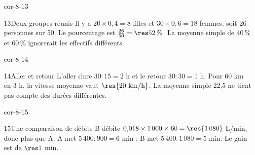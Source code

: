 \begin{blocLivre}{cor-8-13}\begin{corrige}{13}{Deux groupes réunis}
Il y a $20\times0{,}4=8$ filles et $30\times0{,}6=18$ femmes, soit 26 personnes sur 50. Le pourcentage est $\frac{26}{50}=\res{52\,\%}$. La moyenne simple de 40\,\% et 60\,\% ignorerait les effectifs différents.
\end{corrige}\end{blocLivre}
\begin{blocLivre}{cor-8-14}\begin{corrige}{14}{Aller et retour}
L’aller dure $30:15=2$ h et le retour $30:30=1$ h. Pour 60 km en 3 h, la vitesse moyenne vaut $\res{20\ \mathrm{km/h}}$. La moyenne simple 22,5 ne tient pas compte des durées différentes.
\end{corrige}\end{blocLivre}
\begin{blocLivre}{cor-8-15}\begin{corrige}{15}{Une comparaison de débits}
B débite $0{,}018\times1\,000\times60=\res{1\,080}$ L/min, donc plus que A. A met $5\,400:900=6$ min ; B met $5\,400:1\,080=5$ min. Le gain est de $\res1$ min.
\end{corrige}\end{blocLivre}
